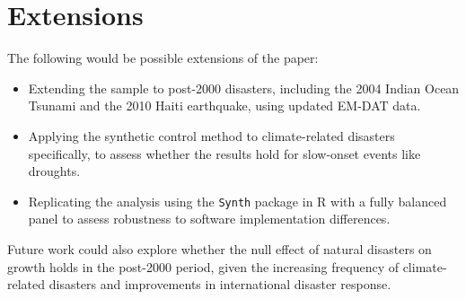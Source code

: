 \documentclass[12pt]{article}
\begin{document}
\section{Extensions}

The following would be possible extensions of the paper:

\begin{itemize}
    \item Extending the sample to post-2000 disasters, including the 2004 Indian Ocean Tsunami and the 2010 Haiti earthquake, using updated EM-DAT data.
    \item Applying the synthetic control method to climate-related disasters specifically, to assess whether the results hold for slow-onset events like droughts.
    \item Replicating the analysis using the \texttt{Synth} package in R with a fully balanced panel to assess robustness to software implementation differences.
\end{itemize}

Future work could also explore whether the null effect of natural disasters on growth holds in the post-2000 period, given the increasing frequency of climate-related disasters and improvements in international disaster response.



\end{document}
